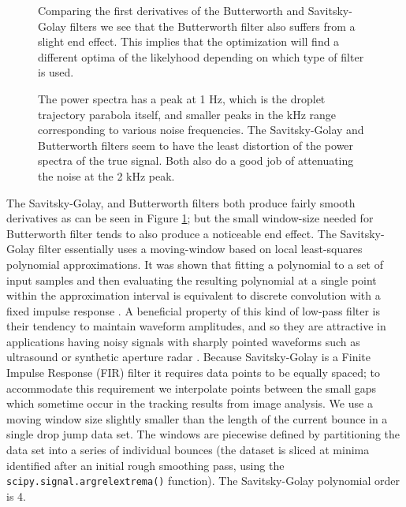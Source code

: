 \documentclass[12pt,a4paper,oneside]{book}
\begin{document}
\begin{figure}
    \centering
    
    \caption{Comparing the first derivatives of the Butterworth and Savitsky-Golay filters we see that the Butterworth filter also suffers from a slight end effect. This implies that the optimization will find a different optima of the likelyhood depending on which type of filter is used.\label{fig:dy_filtered}}
\end{figure}

\begin{figure}
    \centering
    
    \caption{The power spectra has a peak at 1 Hz, which is the droplet trajectory parabola itself, and smaller peaks in the kHz range corresponding to various noise frequencies. The Savitsky-Golay and Butterworth filters seem to have the least distortion of the power spectra of the true signal. Both also do a good job of attenuating the noise at the 2 kHz peak. \label{fig:power}}
\end{figure}
The Savitsky-Golay, and Butterworth filters both produce fairly smooth derivatives as can be seen in Figure \ref{fig:dy_filtered}; but the small window-size needed for Butterworth filter tends to also produce a noticeable end effect. The Savitsky-Golay filter essentially uses a moving-window based on local least-squares polynomial approximations. It was shown that fitting a polynomial to a set of input samples and then evaluating the resulting polynomial at a single point within the approximation interval is equivalent to discrete convolution with a fixed impulse response \cite{savitzky_smoothing_1964}. A beneficial property of this kind of low-pass filter is their tendency to maintain waveform amplitudes, and so they are attractive in applications having noisy signals with sharply pointed waveforms such as ultrasound or synthetic aperture radar \cite{schafer_what_2011}. Because Savitsky-Golay is a Finite Impulse Response (FIR) filter it requires data points to be equally spaced; to accommodate this requirement we interpolate points between the small gaps which sometime occur in the tracking results from image analysis. We use a moving window size slightly smaller than the length of the current bounce in a single drop jump data set. The windows are piecewise defined by partitioning the data set into a series of individual bounces (the dataset is sliced at minima identified after an initial rough smoothing pass, using the \verb|scipy.signal.argrelextrema()| function). The Savitsky-Golay polynomial order is 4. 
\end{document}
